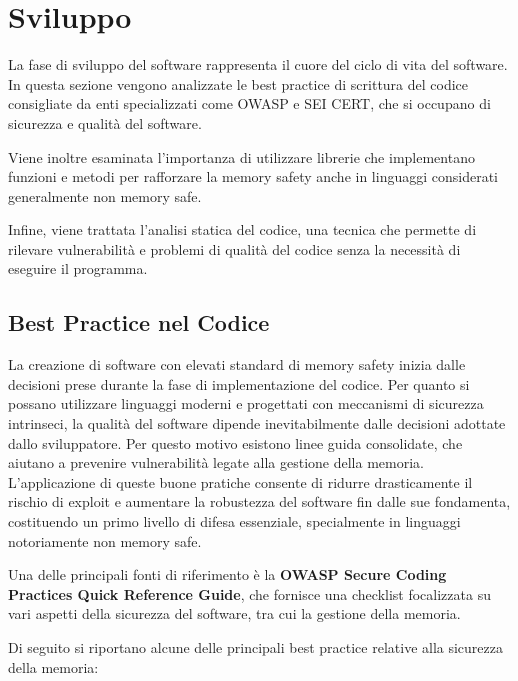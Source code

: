 \section{Sviluppo}
\label{sec:development}

La fase di sviluppo del software rappresenta il cuore del ciclo di vita del software.
In questa sezione vengono analizzate le best practice di scrittura del codice
consigliate da enti specializzati come OWASP e SEI CERT, che si occupano di sicurezza
e qualità del software.

Viene inoltre esaminata l'importanza di utilizzare librerie che implementano funzioni
e metodi per rafforzare la memory safety anche in linguaggi considerati generalmente
non memory safe.

Infine, viene trattata l'analisi statica del codice, una tecnica che permette di
rilevare vulnerabilità e problemi di qualità del codice senza la necessità di eseguire
il programma.

\subsection{Best Practice nel Codice}
\label{sec:best-practices-codice}

La creazione di software con elevati standard di memory safety inizia dalle
decisioni prese durante la fase di implementazione del codice. Per quanto si possano
utilizzare linguaggi moderni e progettati con meccanismi di sicurezza intrinseci,
la qualità del software dipende inevitabilmente dalle decisioni adottate dallo
sviluppatore. Per questo motivo esistono linee guida consolidate, che aiutano a
prevenire vulnerabilità legate alla gestione della memoria. L'applicazione di queste
buone pratiche consente di ridurre drasticamente il rischio di exploit e aumentare
la robustezza del software fin dalle sue fondamenta, costituendo un primo
livello di difesa essenziale, specialmente in linguaggi notoriamente non memory safe.

Una delle principali fonti di riferimento è la \textbf{OWASP Secure Coding
Practices Quick Reference Guide}\cite{owasp_best_practices}, che fornisce una
checklist focalizzata su vari aspetti della sicurezza del software, tra cui la gestione
della memoria.

Di seguito si riportano alcune delle principali best practice relative alla sicurezza
della memoria:

